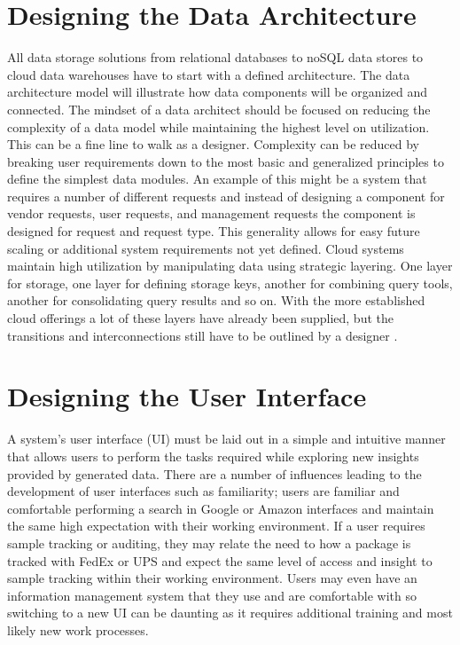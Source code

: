 \documentclass[sigconf]{acmart}
\begin{document}
\section{Designing the Data Architecture}
All data storage solutions from relational databases to noSQL data stores to cloud data warehouses have to start with a defined architecture. The data architecture model will illustrate how data components will be organized and connected. The mindset of a data architect should be focused on reducing the complexity of a data model while maintaining the highest level on utilization. This can be a fine line to walk as a designer. Complexity can be reduced by breaking user requirements down to the most basic and generalized principles to define the simplest data modules. An example of this might be a system that requires a number of different requests and instead of designing a component for vendor requests, user requests, and management requests the component is designed for request and request type. This generality allows for easy future scaling or additional system requirements not yet defined. Cloud systems maintain high utilization by manipulating data using strategic layering. One layer for storage, one layer for defining storage keys, another for combining query tools, another for consolidating query results and so on. With the more established cloud offerings a lot of these layers have already been supplied, but the transitions and interconnections still have to be outlined by a designer \cite{Saltzer}.

\section{Designing the User Interface}
A system's user interface (UI) must be laid out in a simple and intuitive manner that allows users to perform the tasks required while exploring new insights provided by generated data. There are a number of influences leading to the development of user interfaces such as familiarity; users are familiar and comfortable performing a search in Google or Amazon interfaces and maintain the same high expectation with their working environment. If a user requires sample tracking or auditing, they may relate the need to how a package is tracked with FedEx or UPS and expect the same level of access and insight to sample tracking within their working environment. Users may even have an information management system that they use and are comfortable with so switching to a new UI can be daunting as it requires additional training and most likely new work processes.
\end{document}
